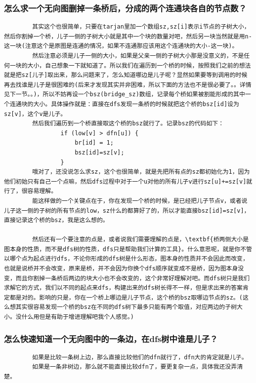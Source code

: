 \documentclass[10pt, a4paper, twocolumn]{article} %
\begin{document}
    \subsubsection{怎么求一个无向图删掉一条桥后，分成的两个连通块各自的节点数？}
    \begin{lstlisting}
        其实这个也很简单，只要在tarjan里加一个数组sz,sz[i]表示i节点的子树大小，然后你割掉一个桥，儿子一侧的子树大小就是其中一个块的数量对吧，然后另一块当然就是用n-这一块(注意这个是原图是连通的情况，如果不连通那应该用这个连通块的大小-这一块)。
        然后注意必须是儿子一侧的大小，如果是父亲一侧的子树大小那是没意义的，不是任何一块的大小，自己想象一下就知道了。所以我们在遍历到一个桥的时候，按照我们之前的想法就是把sz[儿子]取出来，那么问题来了，怎么知道哪边是儿子呢？显然如果要等到调用的时候再去找谁是儿子是很困难的(后来才发现其实并非困难，所以下面的方法也不是很必要了。。详情见下一节。。)，所以不妨再设一个bsz(bridge_sz)数组，记录每个桥如果被割能形成的其中一个连通块的大小。具体操作就是：直接在dfs发现一条桥的时候就把这个桥的bsz[id]设为sz[v]，这个v是儿子。
        然后我们遍历到一个桥直接取这个桥的bsz就行了。记录bsz的代码如下：
                if (low[v] > dfn[u]) {
                    br[id] = 1;
                    bsz[id]=sz[v];
                }
        哦对了，还没说怎么求sz，这个也很简单，就是先把所有点的sz都初始化为1，因为他们初始只有自己一个点嘛，然后dfs过程中对于一个u对他的所有儿子v进行sz[u]+=sz[v]就行了，很容易理解。
        能这样做的一个关键点在于，你在发现一个桥的时候，是已经把儿子节点v，或者说儿子这一侧的子树的所有节点的low，sz什么的都算好了的，所以才能直接bsz[id]=sz[v]，直接记录这个桥的bsz，我是这么想的。
        
        然后还有一个要注意的点是，或者说我们需要理解的点是，\textbf{桥两侧大小是图本身的性质，而不是dfs树的性质，dfs只是帮助我们计算的工具}。什么意思呢，就是你不管以哪个点为起点进行dfs，不论你形成的dfs树是什么形态，图本身的性质并不会因此而改变，也就是说桥并不会改变，原来是桥，并不会因为你换个dfs顺序就变成不是桥，因为图本身没变，而且你割掉一条桥后两边的块大小也不会改变的，这个非常好理解对吧。而dfs树只是我们求解它的方式，我们以不同的起点来dfs，构建出来的dfs树长得不一样，但是求出来的答案肯定都是对的。影响的只是，你在一个桥上哪边是儿子节点，这个桥的bsz取哪边节点的sz。(这么想其实很容易发现一个桥的bsz在不同的dfs树下最多只能有两个取值，对应两边的子树大小。没什么用但是有助于增进理解吧我个人感觉。)
    \end{lstlisting}
    \subsubsection{怎么快速知道一个无向图中的一条边，在dfs树中谁是儿子？}
    \begin{lstlisting}
        如果是比较一条树上边，那么直接比较他们的dfn就行了，dfn大的肯定就是儿子。
        如果是一条非树边，那么就不能直接比较dfn了，要更复杂一点，具体我还没弄清楚。
    \end{lstlisting}
\end{document}
